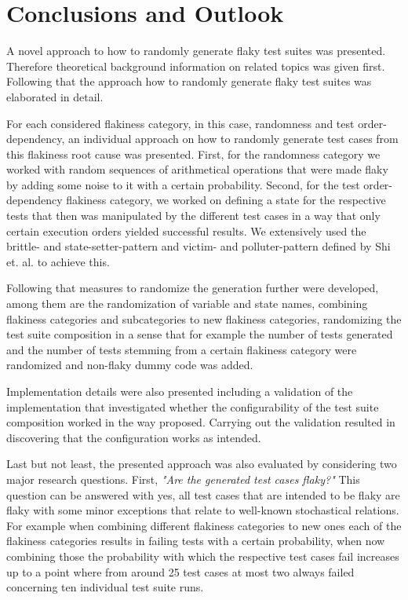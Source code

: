 \documentclass[
fancyheadings, %
%
%
]{stsreprt}
\begin{document}
\chapter{Conclusions and Outlook}\label{ch:conc-futher-work}
A novel approach to how to randomly generate flaky test suites was presented. 
Therefore theoretical background information on related topics was given first. 
Following that the approach how to randomly generate flaky test suites was elaborated in detail. \par
For each considered flakiness category, in this case, randomness and test order-dependency, an individual approach on how to randomly generate test cases from this flakiness root cause was presented. 
First, for the randomness category we worked with random sequences of arithmetical operations that were made flaky by adding some noise to it with a certain probability. 
Second, for the test order-dependency flakiness category, we worked on defining a state for the respective tests that then was manipulated by the different test cases in a way that only certain execution orders yielded successful results. 
We extensively used the brittle- and state-setter-pattern and victim- and polluter-pattern defined by Shi et. al. \cite{ifixflakies:2019} to achieve this. \par
Following that measures to randomize the generation further were developed, among them are the randomization of variable and state names, combining flakiness categories and subcategories to new flakiness categories, randomizing the test suite composition in a sense that for example the number of tests generated and the number of tests stemming from a certain flakiness category were randomized and non-flaky dummy code was added. \par
Implementation details were also presented including a validation of the implementation that investigated whether the configurability of the test suite composition worked in the way proposed. 
Carrying out the validation resulted in discovering that the configuration works as intended. \par
Last but not least, the presented approach was also evaluated by considering two major research questions.
First, \textit{"Are the generated test cases flaky?"}
This question can be answered with yes, all test cases that are intended to be flaky are flaky with some minor exceptions that relate to well-known stochastical relations. 
For example when combining different flakiness categories to new ones each of the flakiness categories results in failing tests with a certain probability, when now combining those the probability with which the respective test cases fail increases up to a point where from around 25 test cases at most two always failed concerning ten individual test suite runs. \par
\end{document}
